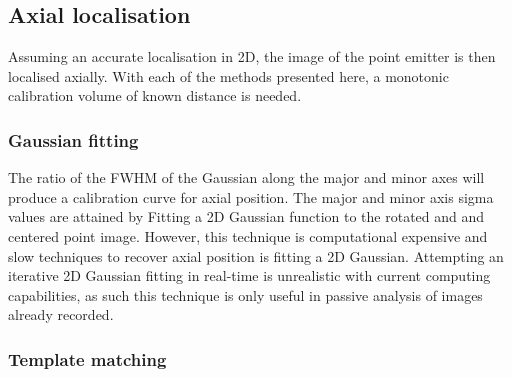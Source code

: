\subsection{Axial localisation}

Assuming an accurate localisation in 2D, the image of the point emitter is then localised axially.
With each of the methods presented here, a monotonic calibration volume of known distance is needed.

%

\subsubsection{Gaussian fitting}

The ratio of the FWHM of the Gaussian along the major and minor axes will produce a calibration curve for axial position.
The major and minor axis sigma values are attained by Fitting a 2D Gaussian function to the rotated and and centered point image.
However, this technique is computational expensive and slow techniques to recover axial position is fitting a 2D Gaussian.
Attempting an iterative 2D Gaussian fitting in real-time is unrealistic with current computing capabilities, as such this technique is only useful in passive analysis of images already recorded.

\subsubsection{Template matching}

